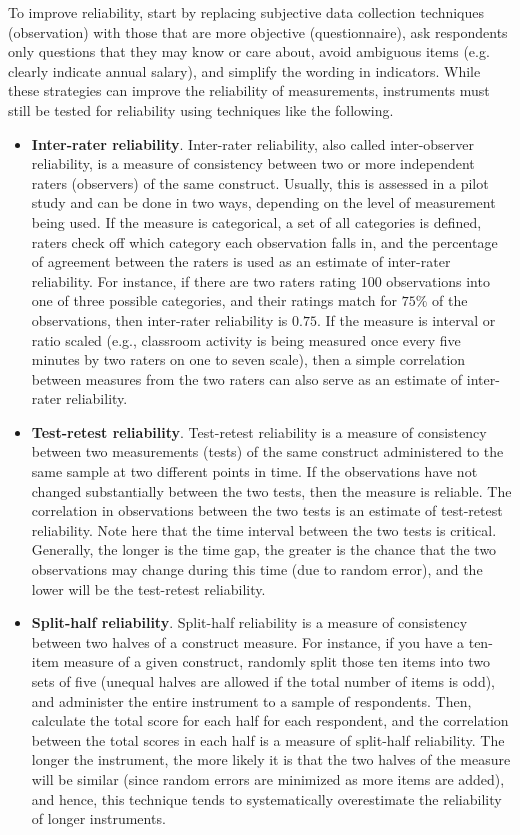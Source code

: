 To improve reliability, start by replacing subjective data collection techniques (observation) with those that are more objective (questionnaire), ask respondents only questions that they may know or care about, avoid ambiguous items (e.g. clearly indicate annual salary), and simplify the wording in indicators. While these strategies can improve the reliability of measurements, instruments must still be tested for reliability using techniques like the following.

\begin{itemize}
	\item \textbf{Inter-rater reliability}. Inter-rater reliability, also called inter-observer reliability, is a measure of consistency between two or more independent raters (observers) of the same construct. Usually, this is assessed in a pilot study and can be done in two ways, depending on the level of measurement being used. If the measure is categorical, a set of all categories is defined, raters check off which category each observation falls in, and the percentage of agreement between the raters is used as an estimate of inter-rater reliability. For instance, if there are two raters rating $ 100 $ observations into one of three possible categories, and their ratings match for $ 75\% $ of the observations, then inter-rater reliability is $ 0.75 $. If the measure is interval or ratio scaled (e.g., classroom activity is being measured once every five minutes by two raters on one to seven scale), then a simple correlation between measures from the two raters can also serve as an estimate of inter-rater reliability.

	\item \textbf{Test-retest reliability}. Test-retest reliability is a measure of consistency between two measurements (tests) of the same construct administered to the same sample at two different points in time. If the observations have not changed substantially between the two tests, then the measure is reliable. The correlation in observations between the two tests is an estimate of test-retest reliability. Note here that the time interval between the two tests is critical. Generally, the longer is the time gap, the greater is the chance that the two observations may change during this time (due to random error), and the lower will be the test-retest reliability.

	\item \textbf{Split-half reliability}. Split-half reliability is a measure of consistency between two halves of a construct measure. For instance, if you have a ten-item measure of a given construct, randomly split those ten items into two sets of five (unequal halves are allowed if the total number of items is odd), and administer the entire instrument to a sample of respondents. Then, calculate the total score for each half for each respondent, and the correlation between the total scores in each half is a measure of split-half reliability. The longer the instrument, the more likely it is that the two halves of the measure will be similar (since random errors are minimized as more items are added), and hence, this technique tends to systematically overestimate the reliability of longer instruments.


\end{itemize}
